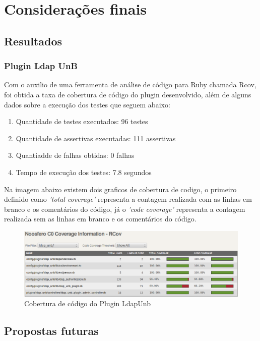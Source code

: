 \chapter{Considerações finais}
\label{consideracoes-finais}


\section{Resultados}
\label{results}

\subsection{Plugin Ldap UnB}

Com o auxilio de uma ferramenta de análise de código para Ruby chamada Rcov, foi obtida a taxa de cobertura de código do plugin desenvolvido, além de alguns dados sobre a execução dos testes que seguem abaixo:
\begin{enumerate}
\item Quantidade de testes executados: 96 testes
\item Quantidade de assertivas executadas: 111 assertivas
\item Quantiadde de falhas obtidas: 0 falhas
\item Tempo de execução dos testes: 7.8 segundos
\end{enumerate}
%
Na imagem abaixo existem dois graficos de cobertura de codigo, o primeiro definido como \textit{'total coverage'} representa a contagem realizada com as linhas em branco e os comentários do código, já o \textit{'code coverage'} representa a contagem realizada sem as linhas em branco e os comentários do código.
%
\begin{figure}[!h]
    \centering
    \includegraphics[keepaspectratio=false,scale=0.45]
      {figuras/cobertura_teste.eps}
    \caption{Cobertura de código do Plugin LdapUnb}
    \label{noosfero_bug}
\end{figure}
%

\section{Propostas futuras}
